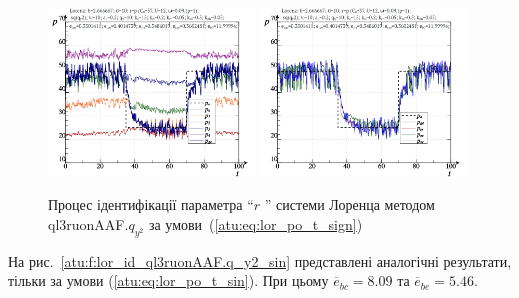 \begin{figure}[ht!]
  \centerline{
    \includegraphics[width=0.49\textwidth]{p/cha/lor/ql3ruonAAF/lor_ql3ruonAAF_qy2-p_t_pi_sign.png}
    \hfill
    \includegraphics[width=0.49\textwidth]{p/cha/lor/ql3ruonAAF/lor_ql3ruonAAF_qy2-p_t_pz_sign.png}
  }
\caption{Процес ідентифікації параметра ``$ r $ '' системи Лоренца методом ql3ruonAAF.$q_{y^2}$ за умови~(\ref{atu:eq:lor_po_t_sign})}
  \label{atu:f:lor_id_ql3ruonAAF.q_y2_sign}
\end{figure}


На рис.~\ref{atu:f:lor_id_ql3ruonAAF.q_y2_sin} представлені аналогічні результати,
тільки за умови (\ref{atu:eq:lor_po_t_sin}). При цьому
$\overline{e}_{bc}=8.09$
та
$\overline{e}_{be}=5.46$.


